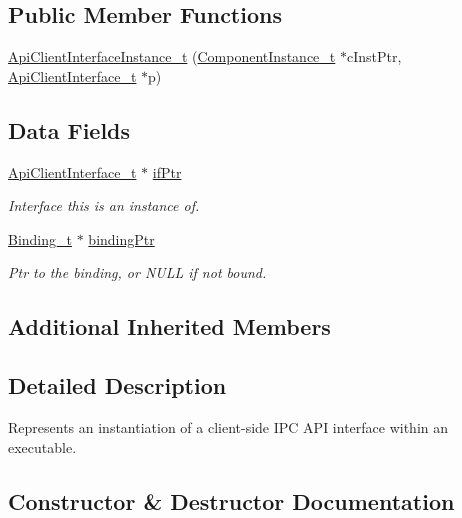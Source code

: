 \subsection*{Public Member Functions}
\begin{DoxyCompactItemize}
\item 
\hyperlink{struct_api_client_interface_instance__t_a9708911ad64a0253f865e45135ccec78}{Api\+Client\+Interface\+Instance\+\_\+t} (\hyperlink{struct_component_instance__t}{Component\+Instance\+\_\+t} $\ast$c\+Inst\+Ptr, \hyperlink{struct_api_client_interface__t}{Api\+Client\+Interface\+\_\+t} $\ast$p)
\end{DoxyCompactItemize}
\subsection*{Data Fields}
\begin{DoxyCompactItemize}
\item 
\hyperlink{struct_api_client_interface__t}{Api\+Client\+Interface\+\_\+t} $\ast$ \hyperlink{struct_api_client_interface_instance__t_a15388775028cc99d2771288acdc70fcc}{if\+Ptr}
\begin{DoxyCompactList}\small\item\em Interface this is an instance of. \end{DoxyCompactList}\item 
\hyperlink{struct_binding__t}{Binding\+\_\+t} $\ast$ \hyperlink{struct_api_client_interface_instance__t_a3cfaa90f7d7911a668560eeda7a19262}{binding\+Ptr}
\begin{DoxyCompactList}\small\item\em Ptr to the binding, or N\+U\+LL if not bound. \end{DoxyCompactList}\end{DoxyCompactItemize}
\subsection*{Additional Inherited Members}


\subsection{Detailed Description}
Represents an instantiation of a client-\/side I\+PC A\+PI interface within an executable. 

\subsection{Constructor \& Destructor Documentation}
